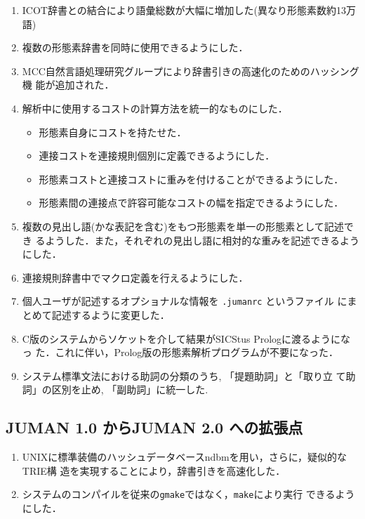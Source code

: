 \documentclass[a4j,titlepage]{jarticle}
\begin{document}
\begin{enumerate}
\item
ICOT辞書との結合により語彙総数が大幅に増加した(異なり形態素数約13万語)
\item
複数の形態素辞書を同時に使用できるようにした．
\item
MCC自然言語処理研究グループにより辞書引きの高速化のためのハッシング機
能が追加された．
\item
解析中に使用するコストの計算方法を統一的なものにした．
  \begin{itemize}
    \item 形態素自身にコストを持たせた．
    \item 連接コストを連接規則個別に定義できるようにした．
    \item 形態素コストと連接コストに重みを付けることができるようにした．
    \item 形態素間の連接点で許容可能なコストの幅を指定できるようにした．
  \end{itemize}
\item
複数の見出し語(かな表記を含む)をもつ形態素を単一の形態素として記述でき
るようした．また，それぞれの見出し語に相対的な重みを記述できるよう
にした．
\item
連接規則辞書中でマクロ定義を行えるようにした．
\item
個人ユーザが記述するオプショナルな情報を {\tt .jumanrc} というファイル
にまとめて記述するように変更した．
\item
C版のシステムからソケットを介して結果がSICStus Prologに渡るようになっ
た．これに伴い，Prolog版の形態素解析プログラムが不要になった．
\item システム標準文法における助詞の分類のうち, 「提題助詞」と「取り立
て助詞」の区別を止め, 「副助詞」に統一した. 
\end{enumerate}

\subsection{JUMAN 1.0 からJUMAN 2.0 への拡張点}

\begin{enumerate}
\item
UNIXに標準装備のハッシュデータベースndbmを用い，さらに，疑似的なTRIE構
造を実現することにより，辞書引きを高速化した．

\item
システムのコンパイルを従来の{\tt gmake}ではなく，{\tt make}により実行
できるようにした．
\end{enumerate}
\end{document}
